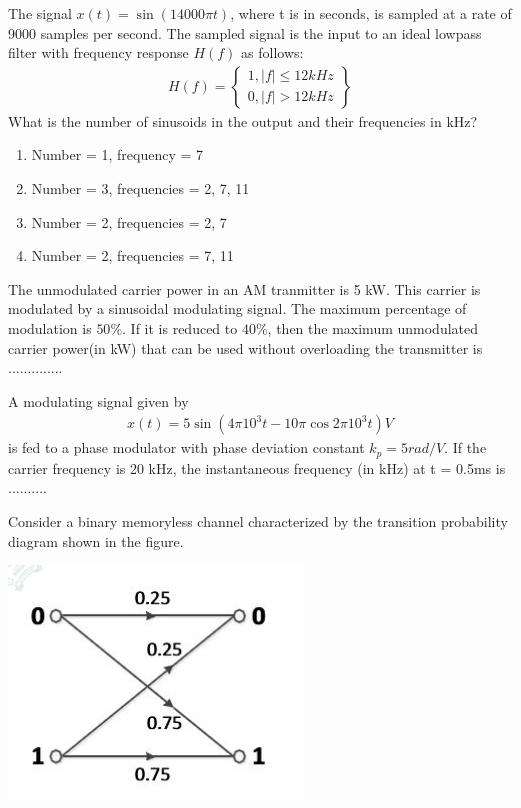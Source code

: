 \item The signal $x(t) = \sin(14000\pi t)$, where t is in seconds, is sampled at a rate of 9000 samples per second. The sampled signal is the input to an ideal lowpass filter with frequency response $H(f)$ as follows:
\begin{align*}
H(f) = 
\left\lbrace
\begin{array}{ll}
      1, |f| \leq 12kHz\\
      0, |f| > 12kHz
\end{array}
\right\rbrace
\end{align*}
What is the number of sinusoids in the output and their frequencies in kHz?
\begin{enumerate}
\item Number = 1, frequency = 7 
\item Number = 3, frequencies = 2, 7, 11
\item Number = 2, frequencies = 2, 7
\item Number = 2, frequencies = 7, 11
\end{enumerate}

\item The unmodulated carrier power in an AM tranmitter is 5 kW. This carrier is modulated by a sinusoidal modulating signal. The maximum percentage of modulation is $50\%$. If it is reduced to $40\%$, then the maximum unmodulated carrier power(in kW) that can be used without overloading the transmitter is ..............

\item A modulating signal given by 
\begin{align*}
x(t) = 5 \sin(4 \pi 10^3 t - 10 \pi \cos2 \pi 10^3 t)V
\end{align*}
is fed to a phase modulator with phase deviation constant $k_{p} = 5 rad/V$. If the carrier frequency is 20 kHz, the instantaneous frequency (in kHz) at t = 0.5ms is ..........

\item Consider a binary memoryless channel characterized by the transition probability diagram shown in the figure.

\includegraphics[scale=0.5]{52}

